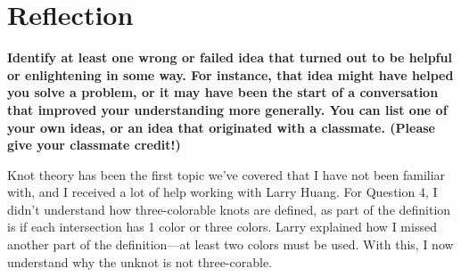 \documentclass[article, 12pt]{article}
\theoremstyle{definition}
\begin{document}
    \section*{Reflection}
    \textbf{Identify at least one wrong or failed idea that turned out to be helpful or enlightening in some way. For instance, that idea might have helped you solve a problem, or it may have been the start of a conversation that improved your understanding more generally. You can list one of your own ideas, or an idea that originated with a classmate. (Please give your classmate credit!)}

    Knot theory has been the first topic we've covered that I have not been familiar with, and I received a lot of help working with Larry Huang. For Question 4, I didn't understand how three-colorable knots are defined, as part of the definition is if each intersection has 1 color or three colors. Larry explained how I missed another part of the definition---at least two colors must be used. With this, I now understand why the unknot is not three-corable.
\end{document}
